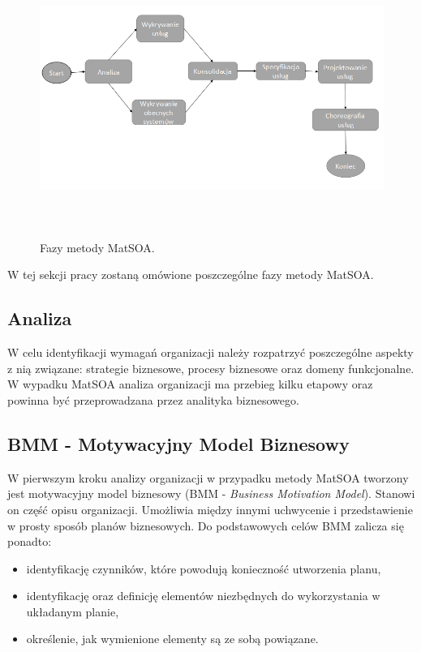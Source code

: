 \begin{figure}[h!tbp]
\begin{centering}
\includegraphics[width=15cm, height=9cm]{img/MetMatSOA_v2.png}
\caption[Fazy metody MatSOA.]{Fazy metody MatSOA.}\label{soam_lifecycle}
\end{centering}
\end{figure}


W tej sekcji pracy zostaną omówione poszczególne fazy metody MatSOA.

\subsection{Analiza}
W celu identyfikacji wymagań organizacji należy rozpatrzyć poszczególne aspekty z nią związane: strategie biznesowe, procesy biznesowe oraz domeny funkcjonalne. W wypadku MatSOA analiza organizacji ma przebieg kilku etapowy oraz powinna być przeprowadzana przez analityka biznesowego.

\subsection*{BMM - Motywacyjny Model Biznesowy}
W pierwszym kroku analizy organizacji w przypadku metody MatSOA tworzony jest motywacyjny model biznesowy (BMM - \emph{Business Motivation Model}). Stanowi on część opisu organizacji. Umożliwia między innymi uchwycenie i przedstawienie w prosty sposób planów biznesowych. Do podstawowych celów BMM zalicza się ponadto:
\begin{itemize}
\item{identyfikację czynników, które powodują konieczność utworzenia planu,}
\item{identyfikację oraz definicję elementów niezbędnych do wykorzystania w układanym planie,}
\item{określenie, jak wymienione elementy są ze sobą powiązane.}
\end{itemize}

